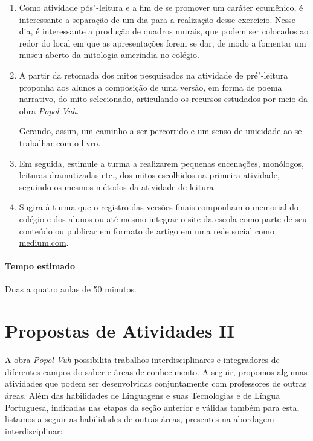 \documentclass[11pt]{extarticle}
\begin{document}
\begin{enumerate}
\item
Como atividade pós"-leitura e a fim de se promover um caráter ecumênico, é
interessante a separação de um dia para a realização desse exercício. Nesse
dia, é interessante a produção de quadros murais, que podem ser
colocados ao redor do local em que as apresentações forem se dar, de
modo a fomentar um museu aberto da mitologia ameríndia no colégio. 

\item
A partir da retomada dos mitos pesquisados na atividade de pré"-leitura proponha aos 
alunos a composição de uma versão, em forma de poema narrativo, do mito selecionado, 
articulando os recursos estudados por meio da obra \emph{Popol Vuh}.

Gerando, assim, um caminho a ser percorrido e um senso de unicidade ao se trabalhar com o
livro. 

\item
Em seguida, estimule a turma a realizarem pequenas encenações,
monólogos, leituras dramatizadas etc., dos mitos escolhidos na primeira
atividade, seguindo os mesmos métodos da atividade de leitura.

\item
Sugira à turma que o registro das versões finais componham o memorial do colégio e
dos alunos ou até mesmo integrar o site da escola como parte de seu conteúdo ou 
publicar em formato de artigo em uma rede social como \url{medium.com}.

\end{enumerate}

\paragraph{Tempo estimado} Duas a quatro aulas de 50 minutos. 

\section{Propostas de Atividades II}

A obra \emph{Popol Vuh} possibilita trabalhos interdisciplinares e
integradores de diferentes campos do saber e áreas de conhecimento. A
seguir, propomos algumas atividades que podem ser desenvolvidas
conjuntamente com professores de outras áreas. Além das habilidades de
Linguagens e suas Tecnologias e de Língua Portuguesa, indicadas nas
etapas da seção anterior e válidas também para esta, listamos a seguir
as habilidades de outras áreas, presentes na abordagem interdisciplinar:
\end{document}
